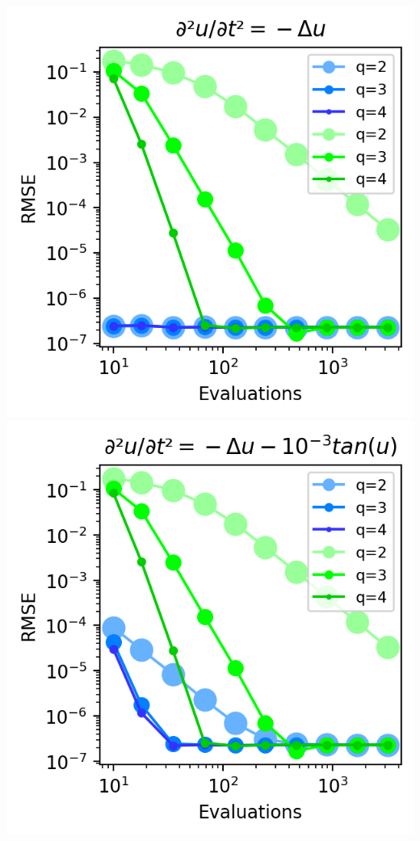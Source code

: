 \begin{center}
    \includegraphics[width=\columnwidth]{../images/solver_wave.png}
    \label{fig:wave}
    \includegraphics[width=\columnwidth]{../images/solver_wave and medium tan.png}

\end{center}
